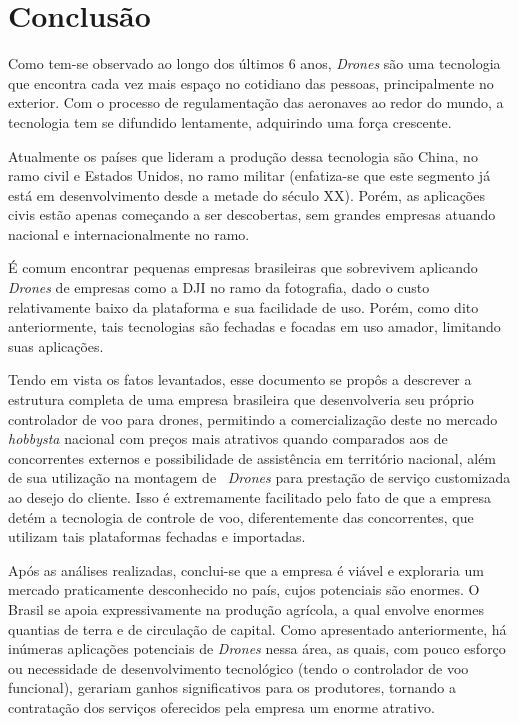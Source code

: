 \section{Conclusão}

Como tem-se observado ao longo dos últimos 6 anos, \emph{Drones
} são uma tecnologia que encontra cada vez mais espaço no 
cotidiano das pessoas, principalmente no exterior. Com o 
processo de regulamentação das aeronaves ao redor do mundo, a
tecnologia tem se difundido lentamente, adquirindo uma força
crescente.

Atualmente os países que lideram a produção dessa tecnologia
são China, no ramo civil e Estados Unidos, no ramo militar
(enfatiza-se que este segmento já está em desenvolvimento desde
a metade do século XX). Porém, as aplicações civis estão apenas
começando a ser descobertas, sem grandes empresas atuando 
nacional e internacionalmente no ramo. 

É comum encontrar pequenas empresas brasileiras que sobrevivem
aplicando \emph{Drones} de empresas como a DJI no ramo da 
fotografia, dado o custo relativamente baixo da plataforma e 
sua facilidade de uso. Porém, como dito anteriormente, tais 
tecnologias são fechadas e focadas em uso amador, limitando 
suas aplicações.

Tendo em vista os fatos levantados, esse documento se propôs
a descrever a estrutura completa de uma empresa brasileira que
desenvolveria seu próprio controlador de voo para drones,
permitindo a comercialização deste no mercado \emph{hobbysta} 
nacional com preços mais atrativos quando comparados aos de 
concorrentes externos e possibilidade de assistência em 
território nacional, além de sua utilização na montagem de \
\emph{Drones} para prestação de serviço customizada ao desejo 
do cliente. Isso é extremamente facilitado pelo fato de que a 
empresa detém a tecnologia de controle de voo, diferentemente 
das concorrentes, que utilizam tais plataformas fechadas 
e importadas.

Após as análises realizadas, conclui-se que a empresa é viável
e exploraria um mercado praticamente desconhecido no país, 
cujos potenciais são enormes. O Brasil se apoia expressivamente
na produção agrícola, a qual envolve enormes quantias de terra 
e de circulação de capital. Como apresentado anteriormente, há
inúmeras aplicações potenciais de \emph{Drones} nessa área, as 
quais, com pouco esforço ou necessidade de desenvolvimento 
tecnológico (tendo o controlador de voo funcional), gerariam
ganhos significativos para os produtores, tornando a 
contratação dos serviços oferecidos pela empresa um enorme
atrativo.


